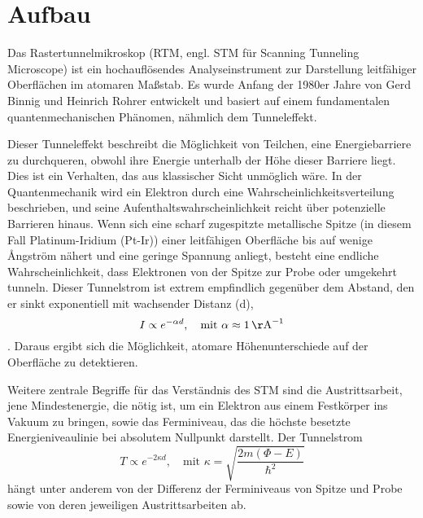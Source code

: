 \chapter{Aufbau}


Das Rastertunnelmikroskop (RTM, engl. STM für Scanning Tunneling Microscope) ist ein hochauflösendes Analyseinstrument zur Darstellung leitfähiger Oberflächen im atomaren Maßstab. Es wurde Anfang der 1980er Jahre von Gerd Binnig und Heinrich Rohrer entwickelt und basiert auf einem fundamentalen quantenmechanischen Phänomen, nähmlich dem Tunneleffekt.

Dieser Tunneleffekt beschreibt die Möglichkeit von Teilchen, eine Energiebarriere zu durchqueren, obwohl ihre Energie unterhalb der Höhe dieser Barriere liegt. Dies ist ein Verhalten, das aus klassischer Sicht unmöglich wäre. In der Quantenmechanik wird ein Elektron durch eine Wahrscheinlichkeitsverteilung beschrieben, und seine Aufenthaltswahrscheinlichkeit reicht über potenzielle Barrieren hinaus. Wenn sich eine scharf zugespitzte metallische Spitze (in diesem Fall Platinum-Iridium (Pt-Ir)) einer leitfähigen Oberfläche bis auf wenige Ångström nähert und eine geringe Spannung anliegt, besteht eine endliche Wahrscheinlichkeit, dass Elektronen von der Spitze zur Probe oder umgekehrt tunneln. Dieser Tunnelstrom ist extrem empfindlich gegenüber dem Abstand, den er sinkt exponentiell mit wachsender Distanz (d), 
\begin{equation}
    I \propto e^{-\alpha d}, \quad \text{mit } \alpha \approx 1\, \mathrm{\AA}^{-1} %
\end{equation}
\cite{Tunnelstrom}. Daraus ergibt sich die Möglichkeit, atomare Höhenunterschiede auf der Oberfläche zu detektieren.

Weitere zentrale Begriffe für das Verständnis des STM sind die Austrittsarbeit, jene Mindestenergie, die nötig ist, um ein Elektron aus einem Festkörper ins Vakuum zu bringen, sowie das Ferminiveau, das die höchste besetzte Energieniveaulinie bei absolutem Nullpunkt darstellt. Der Tunnelstrom 
\begin{equation}
    T \propto e^{-2\kappa d}, \quad \text{mit } \kappa = \sqrt{\frac{2m(\Phi - E)}{\hbar^2}}
\end{equation}
\cite{Temperatur}
hängt unter anderem von der Differenz der Ferminiveaus von Spitze und Probe sowie von deren jeweiligen Austrittsarbeiten ab.


